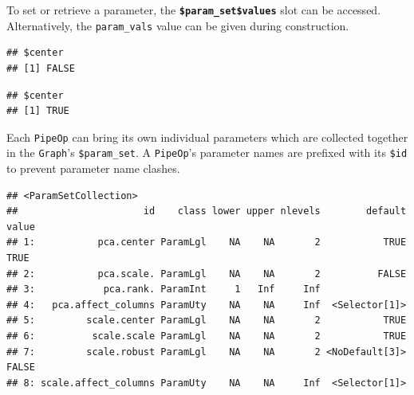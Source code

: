\documentclass[
]{scrbook}
\newenvironment{Shaded}{\begin{snugshade}}{\end{snugshade}}
\newcommand{\AttributeTok}[1]{\textcolor[rgb]{0.77,0.63,0.00}{#1}}
\newcommand{\ConstantTok}[1]{\textcolor[rgb]{0.00,0.00,0.00}{#1}}
\newcommand{\FunctionTok}[1]{\textcolor[rgb]{0.00,0.00,0.00}{#1}}
\newcommand{\NormalTok}[1]{#1}
\newcommand{\OtherTok}[1]{\textcolor[rgb]{0.56,0.35,0.01}{#1}}
\newcommand{\SpecialCharTok}[1]{\textcolor[rgb]{0.00,0.00,0.00}{#1}}
\newcommand{\StringTok}[1]{\textcolor[rgb]{0.31,0.60,0.02}{#1}}
\renewenvironment{Shaded} {\begin{snugshade}\small} {\end{snugshade}}
\begin{document}
To set or retrieve a parameter, the \textbf{\texttt{\$param\_set\$values}} slot can be accessed.
Alternatively, the \texttt{param\_vals} value can be given during construction.

\begin{Shaded}
\end{Shaded}

\begin{verbatim}
## $center
## [1] FALSE
\end{verbatim}

\begin{Shaded}
\end{Shaded}

\begin{verbatim}
## $center
## [1] TRUE
\end{verbatim}

Each \texttt{PipeOp} can bring its own individual parameters which are collected together in the \texttt{Graph}'s \texttt{\$param\_set}.
A \texttt{PipeOp}'s parameter names are prefixed with its \texttt{\$id} to prevent parameter name clashes.

\begin{Shaded}
\end{Shaded}

\begin{verbatim}
## <ParamSetCollection>
##                      id    class lower upper nlevels        default value
## 1:           pca.center ParamLgl    NA    NA       2           TRUE  TRUE
## 2:           pca.scale. ParamLgl    NA    NA       2          FALSE      
## 3:            pca.rank. ParamInt     1   Inf     Inf                     
## 4:   pca.affect_columns ParamUty    NA    NA     Inf  <Selector[1]>      
## 5:         scale.center ParamLgl    NA    NA       2           TRUE      
## 6:          scale.scale ParamLgl    NA    NA       2           TRUE      
## 7:         scale.robust ParamLgl    NA    NA       2 <NoDefault[3]> FALSE
## 8: scale.affect_columns ParamUty    NA    NA     Inf  <Selector[1]>
\end{verbatim}
\end{document}
